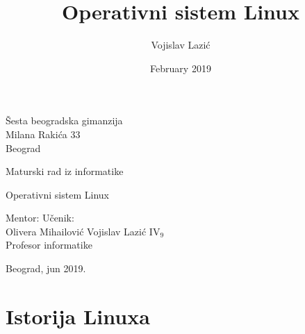 \documentclass[12pt,twoside,a4paper]{article}
\title{Operativni sistem Linux}
\author{Vojislav Lazić}
\date{February 2019}
\begin{document}
    \thispagestyle{empty}
    \noindent
    Šesta beogradska gimanzija\\
    Milana Rakića 33\\
    Beograd
    \vfill
    \begin{center}
        \begin{Large}
        Maturski rad iz informatike\\
        \medskip 
        \end{Large}
        {\Huge
        Operativni sistem Linux}
    \end{center}
    \vfill
    \noindent Mentor: \hfill Učenik:\\
    Olivera Mihailović \hfill Vojislav Lazić IV$_{9}$\\
    Profesor informatike
    \vfill
    \begin{center}
        Beograd, jun 2019.
    \end{center}
\thispagestyle{empty}


\newpage
\tableofcontents
\newpage
\section{Istorija Linuxa}


\renewcommand\refname{Literatura}


\end{document}
